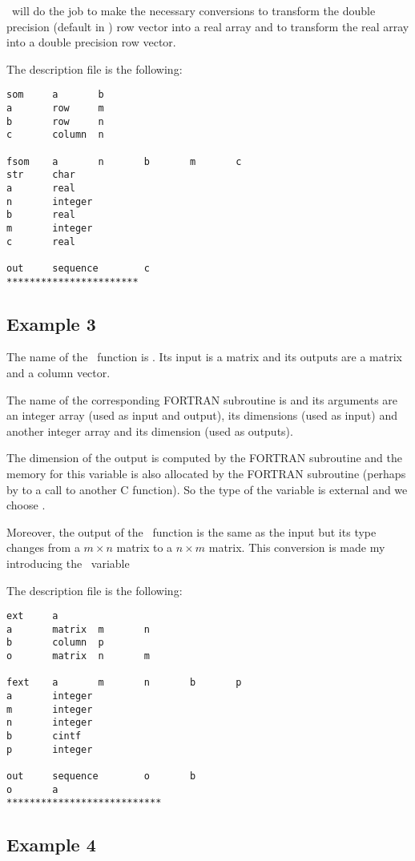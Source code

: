 \ISCI\ will do the job to make the necessary conversions to transform the
double precision (default in \SCI) row vector  into a real array and to
transform the real array  into a double precision row vector.

The description file is the following:
\begin{verbatim}
som     a       b
a       row     m
b       row     n
c       column  n

fsom    a       n       b       m       c
str     char
a       real
n       integer
b       real
m       integer
c       real

out     sequence        c
***********************
\end{verbatim}

\subsection{Example 3}
\label{ex3}

The name of the \SCI\ function is . Its input is a matrix and its
outputs are a matrix and a column vector.

The name of the corresponding FORTRAN subroutine is  and its arguments
are an integer array (used as input and output), its dimensions (used as
input) and another integer array and its dimension (used as outputs).

The dimension  of the output  is computed by the FORTRAN subroutine
and the memory for this variable is also allocated by the FORTRAN subroutine
(perhaps by to a call to another C function). So the type of the variable is
external and we choose .

Moreover, the output  of the \SCI\ function is the same as the input
but its type changes from a $m \times n$ matrix to a $n \times m$ matrix. This
conversion is made my introducing the \SCI\ variable 

The description file is the following:
\begin{verbatim}
ext     a
a       matrix  m       n
b       column  p
o       matrix  n       m

fext    a       m       n       b       p
a       integer
m       integer
n       integer
b       cintf
p       integer

out     sequence        o       b
o       a
***************************
\end{verbatim}

\subsection{Example 4}
\label{ex4}

